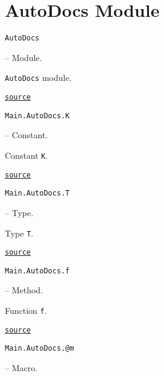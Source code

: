 \label{13360040930512514124}{}




\section{AutoDocs Module}



\label{14974050576722623319}{}

\hypertarget{11302554442225637105}{\texttt{AutoDocs}}  -- {Module.}

\begin{adjustwidth}{2em}{0pt}

\texttt{AutoDocs} module.



\href{https://github.com/BambOoxX/Documenter.jl/blob/d157febde213549ed0d45c894f0651560da477d3/test/examples/make.jl#L76}{\texttt{source}}


\end{adjustwidth}
\hypertarget{15441025252371609530}{\texttt{Main.AutoDocs.K}}  -- {Constant.}

\begin{adjustwidth}{2em}{0pt}

Constant \texttt{K}.



\href{https://github.com/BambOoxX/Documenter.jl/blob/d157febde213549ed0d45c894f0651560da477d3/test/examples/make.jl#L89}{\texttt{source}}


\end{adjustwidth}
\hypertarget{12338358314596597808}{\texttt{Main.AutoDocs.T}}  -- {Type.}

\begin{adjustwidth}{2em}{0pt}

Type \texttt{T}.



\href{https://github.com/BambOoxX/Documenter.jl/blob/d157febde213549ed0d45c894f0651560da477d3/test/examples/make.jl#L92}{\texttt{source}}


\end{adjustwidth}
\hypertarget{14053004641171891989}{\texttt{Main.AutoDocs.f}}  -- {Method.}

\begin{adjustwidth}{2em}{0pt}

Function \texttt{f}.



\href{https://github.com/BambOoxX/Documenter.jl/blob/d157febde213549ed0d45c894f0651560da477d3/test/examples/make.jl#L86}{\texttt{source}}


\end{adjustwidth}
\hypertarget{7256264955516068825}{\texttt{Main.AutoDocs.@m}}  -- {Macro.}


